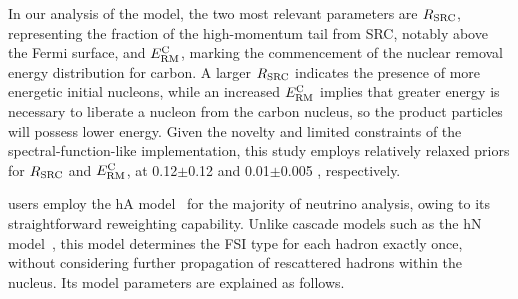 In our analysis of the \sfcfg model, the two most relevant parameters are $R_\textrm{SRC}$, representing the fraction of the high-momentum tail from SRC, notably above the Fermi surface, and $E_\textrm{RM}^\textrm{C}$, marking the commencement of the nuclear removal energy distribution for carbon. A larger $R_\textrm{SRC}$ indicates the presence of more energetic initial nucleons, while an increased $E_\textrm{RM}^\textrm{C}$ implies that greater energy is necessary to liberate a nucleon from the carbon nucleus, so the product particles will possess lower energy. Given the novelty and limited constraints of the spectral-function-like implementation, this study employs relatively relaxed priors for $R_\textrm{SRC}$ and $E_\textrm{RM}^\textrm{C}$, at 0.12$\pm$0.12 and 0.01$\pm$0.005 \gev, respectively.

\genie users employ the hA model~\cite{Andreopoulos:2015wxa} for the majority of neutrino analysis, owing to its straightforward reweighting capability. Unlike cascade models such as the hN model~\cite{Andreopoulos:2015wxa}, this model determines the FSI type for each hadron exactly once, without considering further propagation of rescattered hadrons within the nucleus. Its model parameters are explained as follows.

